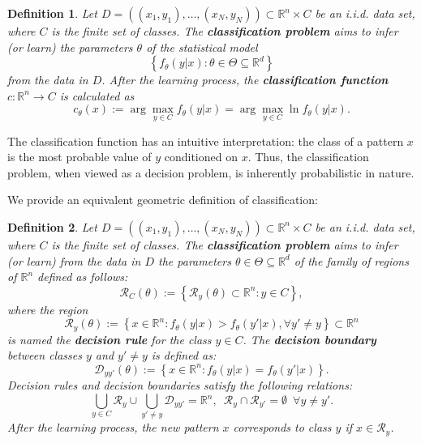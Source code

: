 \documentclass{report}
\newtheorem{definition}{Definition}[chapter]
\begin{document}
\begin{definition}
Let $D = ((x_1,y_1),\dots,(x_N,y_N)) \subset \mathbb{R}^n\times C$ be an i.i.d. data set, where $C$ is the finite set of classes. The \textbf{classification problem} aims to infer (or learn) the parameters $\theta$ of the statistical model
\begin{equation}
\left\{f_\theta(y|x) : \theta \in \Theta \subseteq \mathbb{R}^d\right\}
\end{equation}
from the data in $D$. After the learning process, the \textbf{classification function} $c : \mathbb{R}^n \to C$ is calculated as
\begin{equation}
 c_\theta(x) := \arg\max_{y\in C}f_\theta(y|x) = \arg\max_{y\in C}\ln f_\theta(y|x).
\end{equation}
\end{definition}

The classification function has an intuitive interpretation: the class of a pattern $x$ is the most probable value of $y$ conditioned on $x$. Thus, the classification problem, when viewed as a decision problem, is inherently probabilistic in nature.

We provide an equivalent geometric definition of classification:

\begin{definition}
Let $D = ((x_1,y_1),\dots,(x_N,y_N)) \subset \mathbb{R}^n\times C$ be an i.i.d. data set, where $C$ is the finite set of classes. The \textbf{classification problem} aims to infer (or learn) from the data in $D$ the parameters $\theta \in \Theta \subseteq \mathbb{R}^d$ of the family of regions of $\mathbb{R}^n$ defined as follows:
\begin{equation}
\mathcal{R}_C(\theta) := \left\{\mathcal{R}_y(\theta) \subset \mathbb{R}^n : y \in C\right\},
\end{equation}
where the region
\begin{equation}
\mathcal{R}_y(\theta) := \left\{x \in \mathbb{R}^n : f_\theta(y|x) > f_\theta(y'|x), \forall y' \neq y\right\} \subset \mathbb{R}^n
\end{equation}
is named the \textbf{decision rule} for the class $y \in C$. The \textbf{decision boundary} between classes $y$ and $y'\neq y$ is defined as:
\begin{equation}
\mathcal{D}_{yy'}(\theta) :=\left\{x \in \mathbb{R}^n : f_\theta(y|x) = f_\theta(y'|x) \right\}.
\end{equation}
Decision rules and decision boundaries satisfy the following relations:
\begin{equation}
\bigcup_{y\in C}\mathcal{R}_y \cup \bigcup_{y'\neq y}\mathcal{D}_{yy'} = \mathbb{R}^n,\,\,\,\mathcal{R}_y\cap\mathcal{R}_{y'} = \emptyset\,\,\,\forall y \neq y'.
\end{equation}
After the learning process, the new pattern $x$ corresponds to class $y$ if $x \in \mathcal{R}_y$.
\end{definition}
\end{document}
